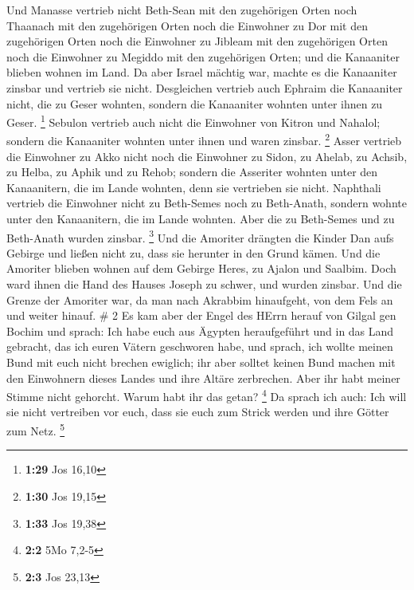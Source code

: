  Und Manasse vertrieb nicht Beth-Sean mit den zugehörigen
Orten noch Thaanach mit den zugehörigen Orten noch die Einwohner zu Dor
mit den zugehörigen Orten noch die Einwohner zu Jibleam mit den
zugehörigen Orten noch die Einwohner zu Megiddo mit den zugehörigen
Orten; und die Kanaaniter blieben wohnen im Land.  Da aber
Israel mächtig war, machte es die Kanaaniter zinsbar und vertrieb sie
nicht.  Desgleichen vertrieb auch Ephraim die Kanaaniter
nicht, die zu Geser wohnten, sondern die Kanaaniter wohnten unter ihnen
zu Geser. \footnote{\textbf{1:29} Jos 16,10}  Sebulon
vertrieb auch nicht die Einwohner von Kitron und Nahalol; sondern die
Kanaaniter wohnten unter ihnen und waren zinsbar. \footnote{\textbf{1:30}
  Jos 19,15}  Asser vertrieb die Einwohner zu Akko nicht
noch die Einwohner zu Sidon, zu Ahelab, zu Achsib, zu Helba, zu Aphik
und zu Rehob;  sondern die Asseriter wohnten unter den
Kanaanitern, die im Lande wohnten, denn sie vertrieben sie nicht.
 Naphthali vertrieb die Einwohner nicht zu Beth-Semes noch
zu Beth-Anath, sondern wohnte unter den Kanaanitern, die im Lande
wohnten. Aber die zu Beth-Semes und zu Beth-Anath wurden zinsbar.
\footnote{\textbf{1:33} Jos 19,38}  Und die Amoriter
drängten die Kinder Dan aufs Gebirge und ließen nicht zu, dass sie
herunter in den Grund kämen.  Und die Amoriter blieben
wohnen auf dem Gebirge Heres, zu Ajalon und Saalbim. Doch ward ihnen die
Hand des Hauses Joseph zu schwer, und wurden zinsbar.  Und
die Grenze der Amoriter war, da man nach Akrabbim hinaufgeht, von dem
Fels an und weiter hinauf. \# 2  Es kam aber der Engel des
HErrn herauf von Gilgal gen Bochim und sprach: Ich habe euch aus Ägypten
heraufgeführt und in das Land gebracht, das ich euren Vätern geschworen
habe, und sprach, ich wollte meinen Bund mit euch nicht brechen
ewiglich;  ihr aber solltet keinen Bund machen mit den
Einwohnern dieses Landes und ihre Altäre zerbrechen. Aber ihr habt
meiner Stimme nicht gehorcht. Warum habt ihr das getan? \footnote{\textbf{2:2}
  5Mo 7,2-5}  Da sprach ich auch: Ich will sie nicht
vertreiben vor euch, dass sie euch zum Strick werden und ihre Götter zum
Netz. \footnote{\textbf{2:3} Jos 23,13}

